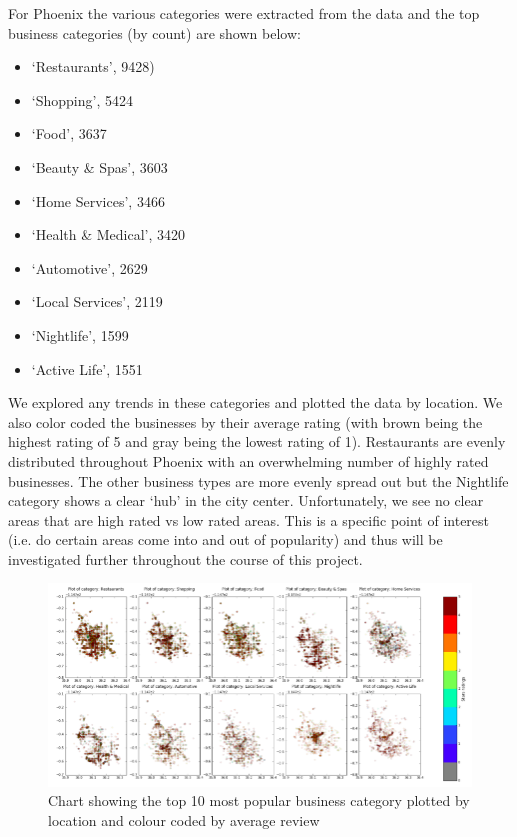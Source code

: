 \documentclass[11pt]{article}
\begin{document}
\par For Phoenix the various categories were extracted from the data and the top business categories (by count) are shown below:
\begin{itemize}
	\item `Restaurants', 9428)
	\item `Shopping', 5424
	\item `Food', 3637
	\item `Beauty \& Spas', 3603
	\item `Home Services', 3466
	\item `Health \& Medical', 3420
	\item `Automotive', 2629
	\item `Local Services', 2119
	\item `Nightlife', 1599
	\item `Active Life', 1551
\end{itemize}

We explored any trends in these categories and plotted the data by location. We also color coded the businesses by their average rating (with brown being the highest rating of 5 and gray being the lowest rating of 1). Restaurants are evenly distributed throughout Phoenix with an overwhelming number of highly rated businesses. The other business types are more evenly spread out but the Nightlife category shows a clear `hub' in the city center. Unfortunately, we see no clear areas that are high rated vs low rated areas. This is a specific point of interest (i.e. do certain areas come into and out of popularity) and thus will be investigated further throughout the course of this project.

\begin{figure}[H]
\centering
\includegraphics[width=1.1\textwidth]{./ac209/phxstarsbycategorylocation.png}
\caption{Chart showing the top 10 most popular business category plotted by location and colour coded by average review}
\end{figure}
\end{document}
